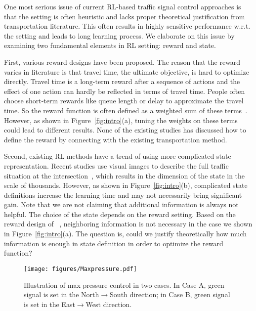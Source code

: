 One most serious issue of current RL-based traffic signal control approaches is that the setting is often heuristic and lacks proper theoretical justification from transportation literature. This often results in highly sensitive performance w.r.t. the setting and leads to long learning process. We elaborate on this issue by examining two fundamental elements in RL setting: reward and state.

First, various reward designs have been proposed. The reason that the reward varies in literature is that travel time, the ultimate objective, is hard to optimize directly. Travel time is a long-term reward after a sequence of actions and the effect of one action can hardly be reflected in terms of travel time. People often choose short-term rewards like queue length or delay to approximate the travel time. So the reward function is often defined as a weighted sum of these terms~\cite{VaOl16,BPT14,ElAb10,ElAA13,wei2018intellilight}. However, as shown in Figure~\ref{fig:intro}(a), tuning the weights on these terms could lead to different results. None of the existing studies has discussed how to define the reward by connecting with the existing transportation method. 

Second, existing RL methods have a trend of using more complicated state representation. Recent studies use visual images to describe the full traffic situation at the intersection~\cite{VaOl16,wei2018intellilight}, which results in the dimension of the state in the scale of thousands. However, as shown in Figure~\ref{fig:intro}(b), complicated state definitions increase the learning time and may not necessarily bring significant gain. Note that we are not claiming that additional information is always not helpful. The choice of the state depends on the reward setting. Based on the reward design of \Deeplight~\cite{wei2018intellilight}, neighboring information is not necessary in the case we shown in Figure~\ref{fig:intro}(a). The question is, could we justify theoretically how much information is enough in state definition in order to optimize the reward function?


\begin{figure}
    \centering
    \texttt{[image: figures/Maxpressure.pdf]}
    \caption{Illustration of max pressure control in two cases. In Case A, green signal is set in the North$\rightarrow$South direction; in Case B, green signal is set in the East$\rightarrow$West direction.}
    \label{fig:pressure}
    \vspace{-2mm}
\end{figure}

